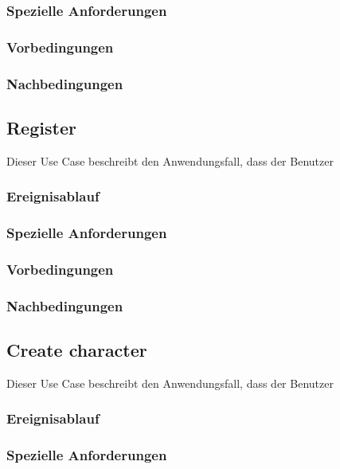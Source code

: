 		\subsubsection{Spezielle Anforderungen}		
			
		\subsubsection{Vorbedingungen}
			
		\subsubsection{Nachbedingungen}
		
	\subsection{Register}
		Dieser Use Case beschreibt den Anwendungsfall, dass der Benutzer 
			
		\subsubsection{Ereignisablauf}
			
		\subsubsection{Spezielle Anforderungen}		
			
		\subsubsection{Vorbedingungen}
			
		\subsubsection{Nachbedingungen}
	
	\subsection{Create character}
		Dieser Use Case beschreibt den Anwendungsfall, dass der Benutzer 
			
		\subsubsection{Ereignisablauf}
			
		\subsubsection{Spezielle Anforderungen}		
			
